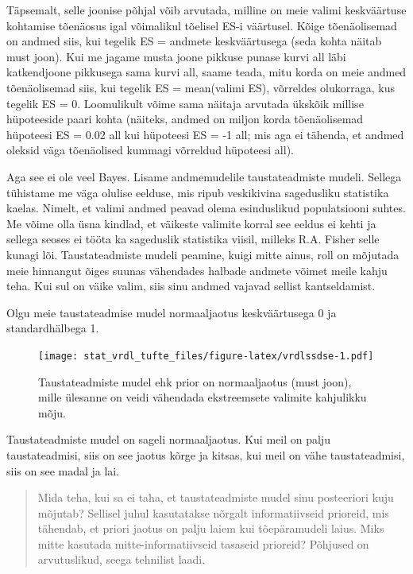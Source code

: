 \documentclass[]{book}
\begin{document}
Täpsemalt, selle joonise põhjal võib arvutada, milline on meie valimi
keskväärtuse kohtamise tõenäosus igal võimalikul tõelisel ES-i
väärtusel. Kõige tõenäolisemad on andmed siis, kui tegelik ES = andmete
keskväärtusega (seda kohta näitab must joon). Kui me jagame musta joone
pikkuse punase kurvi all läbi katkendjoone pikkusega sama kurvi all,
saame teada, mitu korda on meie andmed tõenäolisemad siis, kui tegelik
ES = mean(valimi ES), võrreldes olukorraga, kus tegelik ES = 0.
Loomulikult võime sama näitaja arvutada ükskõik millise hüpoteeside
paari kohta (näiteks, andmed on miljon korda tõenäolisemad hüpoteesi ES
= 0.02 all kui hüpoteesi ES = -1 all; mis aga ei tähenda, et andmed
oleksid väga tõenäolised kummagi võrreldud hüpoteesi all).

Aga see ei ole veel Bayes. Lisame andmemudelile taustateadmiste mudeli.
Sellega tühistame me väga olulise eelduse, mis ripub veskikivina
sagedusliku statistika kaelas. Nimelt, et valimi andmed peavad olema
esinduslikud populatsiooni suhtes. Me võime olla üsna kindlad, et
väikeste valimite korral see eeldus ei kehti ja sellega seoses ei tööta
ka sageduslik statistika viisil, milleks R.A. Fisher selle kunagi lõi.
Taustateadmiste mudeli peamine, kuigi mitte ainus, roll on mõjutada meie
hinnangut õiges suunas vähendades halbade andmete võimet meile kahju
teha. Kui sul on väike valim, siis sinu andmed vajavad sellist
kantseldamist.

Olgu meie taustateadmise mudel normaaljaotus keskväärtusega 0 ja
standardhälbega 1.

\begin{figure}
\centering
\texttt{[image: stat\_vrdl\_tufte\_files/figure-latex/vrdlssdse-1.pdf]}
\caption{\label{fig:vrdlssdse}Taustateadmiste mudel ehk prior on
normaaljaotus (must joon), mille ülesanne on veidi vähendada
ekstreemsete valimite kahjulikku mõju.}
\end{figure}

Taustateadmiste mudel on sageli normaaljaotus. Kui meil on palju
taustateadmisi, siis on see jaotus kõrge ja kitsas, kui meil on vähe
taustateadmisi, siis on see madal ja lai.

\begin{quote}
Mida teha, kui sa ei taha, et taustateadmiste mudel sinu posteeriori
kuju mõjutab? Sellisel juhul kasutatakse nõrgalt informatiivseid
prioreid, mis tähendab, et priori jaotus on palju laiem kui
tõepäramudeli laius. Miks mitte kasutada mitte-informatiivseid tasaseid
prioreid? Põhjused on arvutuslikud, seega tehnilist laadi.
\end{quote}
\end{document}
